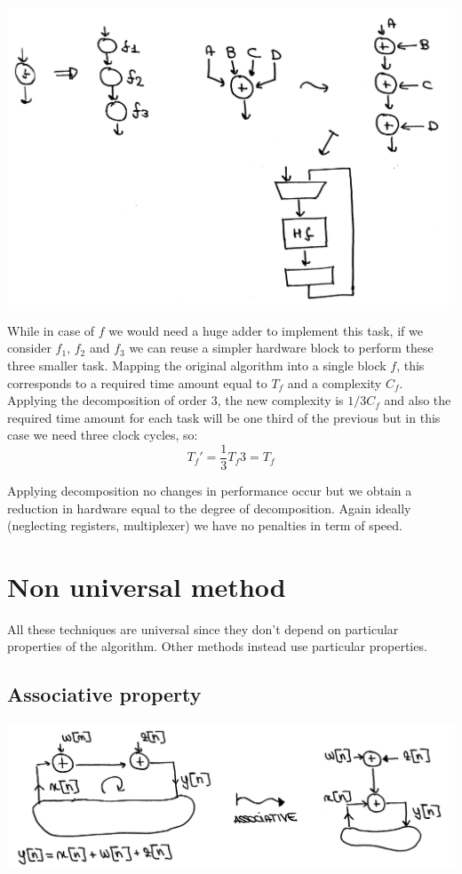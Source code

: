 \begin{center}
  \includegraphics[width=0.7\linewidth]{img/img1/41}
\end{center}

While in case of $f$ we would need a huge adder to implement this task, if we consider $f_1$, $f_2$ and $f_3$ we can reuse a simpler hardware block to perform these three smaller task. Mapping the original algorithm into a single block $f$, this corresponds to a required time amount equal to $T_f$ and a complexity $C_f$. Applying the decomposition of order 3, the new complexity is $1/3 C_f$ and also the required time amount for each task will be one third of the previous but in this case we need three clock cycles, so:
$$T_f'= \frac{1}{3} T_f  3 = T_f$$

Applying decomposition no changes in performance occur but we obtain a reduction in hardware equal to the degree of decomposition. Again ideally (neglecting registers, multiplexer) we have no penalties in term of speed.

\section{Non universal method}
All these techniques are universal since they don't depend on particular properties of the algorithm. Other methods instead use particular properties.

\subsection{Associative property}

\begin{center}
  \includegraphics[width=0.7\linewidth]{img/img1/42}
\end{center}

